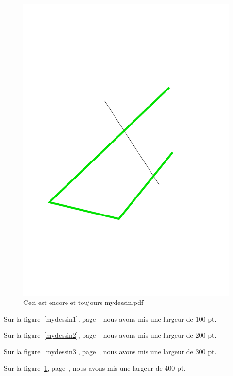 \begin{figure}[!h]
\centering
\includegraphics[width=400pt]{mydessin.pdf}
\caption{Ceci est encore et toujours mydessin.pdf}
\label{mydessin4}
\end{figure}

Sur la figure~\ref{mydessin1}, page~\pageref{mydessin1}, nous avons mis une largeur de 100 pt.

Sur la figure~\ref{mydessin2}, page~\pageref{mydessin2}, nous avons mis une largeur de 200 pt.

Sur la figure~\ref{mydessin3}, page~\pageref{mydessin3}, nous avons mis une largeur de 300 pt.

Sur la figure~\ref{mydessin4}, page~\pageref{mydessin4}, nous avons mis une largeur de 400 pt.

\listoffigures


